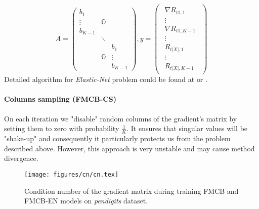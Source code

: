 \documentclass{article}
\begin{document}
\[
A =
\begin{pmatrix}
	b_{1}     		& 				&		  \\
	\vdots			& \mathbb{O}  	&		  \\
	b_{K-1}			& 				&		  \\
					& \ddots		&		  \\
					&   			& b_{1}	  \\
					& \mathbb{O}	& \vdots  \\
					& 				& b_{K-1}
\end{pmatrix},
y=\begin{pmatrix}\begin{array}{l}
	\nabla R_{t1,1}		\\
	\vdots				\\
	\nabla R_{t1,K-1}	\\

	\vdots				\\
	
	R_{t|X|,1}		\\
	\vdots				\\
	R_{t|X|,K-1}
\end{array}\end{pmatrix}
\]
Detailed algorithm for \emph{Elastic-Net} problem could be found at \cite{Hastie_theelements} or \cite{elasticnet05}.

\paragraph{Columns sampling (FMCB-CS)}
On each iteration we "disable" random columns of the gradient's matrix by setting them to zero with probability $\frac{1}{K}$. It ensures that singular values will be "shake-up" and consequently it particularly protects us from the problem described above. However, this approach is very unstable and may cause method divergence.

\begin{figure}
\vskip 0.2in
\begin{center}
\centerline{\texttt{[image: figures/cn/cn.tex]}}
\caption{Condition number of the gradient matrix during training FMCB and FMCB-EN models on \emph{pendigits} dataset.}
\end{center}
\label{fig:condition_number}
\vskip -0.2in
\end{figure}
\end{document}
